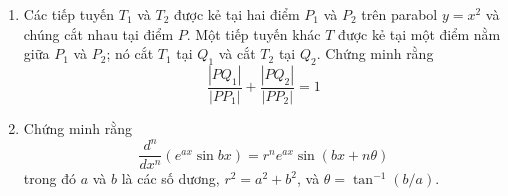 \begin{enumerate}[label=\textbf{\arabic*.}, leftmargin=1.8em, itemsep=9pt, topsep=0pt, start=10]
    \item Các tiếp tuyến $T_1$ và $T_2$ được kẻ tại hai điểm $P_1$ và $P_2$ trên parabol $y = x^2$ và chúng cắt nhau tại điểm $P$. Một tiếp tuyến khác $T$ được kẻ tại một điểm nằm giữa $P_1$ và $P_2$; nó cắt $T_1$ tại $Q_1$ và cắt $T_2$ tại $Q_2$. Chứng minh rằng
    \[
    \frac{|PQ_1|}{|PP_1|} + \frac{|PQ_2|}{|PP_2|} = 1
    \]

    \item Chứng minh rằng
    \[
    \frac{d^n}{dx^n}(e^{ax} \sin bx) = r^n e^{ax} \sin(bx + n\theta)
    \]
    trong đó $a$ và $b$ là các số dương, $r^2 = a^2 + b^2$, và $\theta = \tan^{-1}(b/a)$.
\end{enumerate}

\par\vspace{3pt}%
\noindent{}%
